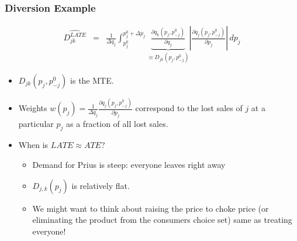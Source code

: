 \documentclass[xcolor=pdftex,dvipsnames,table,mathserif]{beamer}
\begin{document}
\begin{frame}
\frametitle{Diversion Example}
\begin{eqnarray*}
\label{weighteddiversion}
\widehat{D_{jk}^{LATE} }&=& \frac{1}{\Delta q_j} \int_{p_j^{0}}^{p_j^{0}+\Delta p_j} \underbrace{\frac{\partial q_k(p_j,p^{0}_{-j})}{\partial q_j}}_{\equiv D_{jk}(p_j,p^{0}_{-j})} \left| \frac{\partial q_j(p_j,p^{0}_{-j})}{\partial p_j} \right|\, dp_j
\end{eqnarray*}
\begin{itemize}
\item $D_{jk}(p_j,p^{0}_{-j})$ is the MTE.
\item Weights $w(p_j) = \frac{1}{\Delta q_j} \frac{\partial q_j(p_j,p^{0}_{-j})}{\partial p_j}$ correspond to the lost sales of $j$ at a particular $p_j$ as a fraction of all lost sales.
\item When is $LATE \approx ATE$? 
\begin{itemize}
\item Demand for Prius is steep: everyone leaves right away
\item $D_{j,k}(p_j)$ is relatively flat.
\item We might want to think about raising the price to choke price (or eliminating the product from the consumers choice set) same as treating everyone!
\end{itemize}
\end{itemize}
\end{frame}
\end{document}
